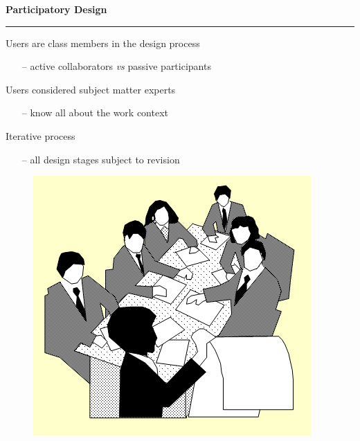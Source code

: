 \documentclass[pdf]{beamer}
\begin{document}
\begin{frame}
\vspace{8mm}
\textcolor{myBlue}{\textbf{\Large{Participatory Design}}}

\textcolor{red}{\rule{10cm}{1mm}}

{\LARGE Users are  class members in the design process\LARGE}
\begin{itemize}
    \item[\textcolor{black}{--}]active collaborators \textit{vs} passive participants
\end{itemize}

\bigskip

{\LARGE Users considered subject matter experts \LARGE}
\begin{itemize}
    \item[\textcolor{black}{--}]know all about the work context
\end{itemize}

\bigskip

{\LARGE Iterative process \LARGE}
\begin{itemize}
    \item[\textcolor{black}{--}]all design stages subject to revision
\end{itemize}

\begin{figure}[b]
    	\begin{flushright}
    	\includegraphics[scale = 0.3]{moro5.PNG}
        \end{flushright}
        \end{figure}
\end{frame}
\end{document}

